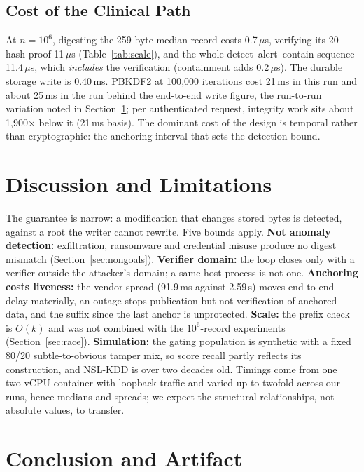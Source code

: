 \documentclass[conference]{IEEEtran}
\begin{document}
\subsection{Cost of the Clinical Path}
\label{sec:cost}
At $n=10^6$, digesting the 259-byte median record costs 0.7\,$\mu$s, verifying its 20-hash proof 11\,$\mu$s (Table~\ref{tab:scale}), and the whole detect--alert--contain sequence 11.4\,$\mu$s, which \emph{includes} the verification (containment adds 0.2\,$\mu$s). The durable storage write is 0.40\,ms. PBKDF2 at 100{,}000 iterations cost 21\,ms in this run and about 25\,ms in the run behind the end-to-end write figure, the run-to-run variation noted in Section~\ref{sec:limits}; per authenticated request, integrity work sits about 1{,}900$\times$ below it (21\,ms basis). The dominant cost of the design is temporal rather than cryptographic: the anchoring interval that sets the detection bound.

\section{Discussion and Limitations}
\label{sec:limits}

The guarantee is narrow: a modification that changes stored bytes is detected, against a root the writer cannot rewrite. Five bounds apply. \textbf{Not anomaly detection:} exfiltration, ransomware and credential misuse produce no digest mismatch (Section~\ref{sec:nongoals}). \textbf{Verifier domain:} the loop closes only with a verifier outside the attacker's domain; a same-host process is not one. \textbf{Anchoring costs liveness:} the vendor spread (91.9\,ms against 2.59\,s) moves end-to-end delay materially, an outage stops publication but not verification of anchored data, and the suffix since the last anchor is unprotected. \textbf{Scale:} the prefix check is $O(k)$ and was not combined with the $10^6$-record experiments (Section~\ref{sec:race}). \textbf{Simulation:} the gating population is synthetic with a fixed 80/20 subtle-to-obvious tamper mix, so score recall partly reflects its construction, and NSL-KDD is over two decades old. Timings come from one two-vCPU container with loopback traffic and varied up to twofold across our runs, hence medians and spreads; we expect the structural relationships, not absolute values, to transfer.

\section{Conclusion and Artifact}
\label{sec:artifact}
\end{document}
